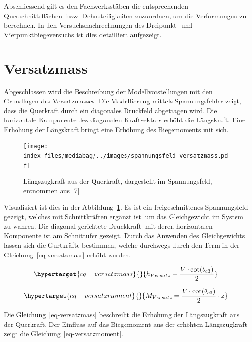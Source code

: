 \documentclass[
  12pt,
  letterpaper,
  egregdoesnotlikesansseriftitles]{scrreprt}
\begin{document}
Abschliessend gilt es den Fachwerksstäben die entsprechenden
Querschnittsflächen, bzw. Dehnsteifigkeiten zuzuordnen, um die
Verformungen zu berechnen. In den Versuchsnachrechnungen des Dreipunkt-
und Vierpunktbiegeversuchs ist dies detailliert aufgezeigt.

\hypertarget{sec-versatzmass}{%
\section{Versatzmass}\label{sec-versatzmass}}

Abgeschlossen wird die Beschreibung der Modellvorstellungen mit den
Grundlagen des Versatzmasses. Die Modellierung mittels Spannungsfelder
zeigt, dass die Querkraft durch ein diagonales Druckfeld abgetragen
wird. Die horizontale Komponente des diagonalen Kraftvektors erhöht die
Längskraft. Eine Erhöhung der Längskraft bringt eine Erhöhung des
Biegemoments mit sich.

\begin{figure}[H]

{\centering \texttt{[image: index\_files/mediabag/../images/spannungsfeld\_versatzmass.pdf]}

}

\caption{\label{fig-laengszug_spf}Längszugkraft aus der Querkraft,
dargestellt im Spannungsfeld, entnommen aus
{[}\protect\hyperlink{ref-Thoma2020}{7}{]}}

\end{figure}

Visualisiert ist dies in der Abbildung~\ref{fig-laengszug_spf}. Es ist
ein freigeschnittenes Spannungsfeld gezeigt, welches mit Schnittkräften
ergänzt ist, um das Gleichgewicht im System zu wahren. Die diagonal
gerichtete Druckkraft, mit deren horizontalen Komponente ist am
Schnittufer gezeigt. Durch das Anwenden des Gleichgewichts lassen sich
die Gurtkräfte bestimmen, welche durchwegs durch den Term in der
Gleichung~\ref{eq-versatzmass} erhöht werden.

\begin{equation}\protect\hypertarget{eq-versatzmass}{}{
h_{Versatz} = \frac{V \cdot \cot(\theta_{c3})}{2}
}\label{eq-versatzmass}\end{equation}

\begin{equation}\protect\hypertarget{eq-versatzmoment}{}{
M_{Versatz} = \frac{V \cdot \cot(\theta_{c3})}{2} \cdot z
}\label{eq-versatzmoment}\end{equation}

Die Gleichung~\ref{eq-versatzmass} beschreibt die Erhöhung der
Längszugkraft aus der Querkraft. Der Einfluss auf das Biegemoment aus
der erhöhten Längszugkraft zeigt die Gleichung~\ref{eq-versatzmoment}.
\end{document}
